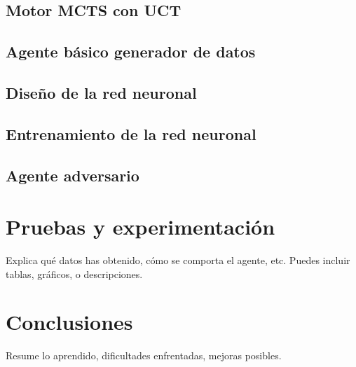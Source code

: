 \documentclass[conference]{IEEEtran}
\begin{document}
\subsection{Motor MCTS con UCT}


\subsection{Agente básico generador de datos}


\subsection{Diseño de la red neuronal}


\subsection{Entrenamiento de la red neuronal}


\subsection{Agente adversario}



\section{Pruebas y experimentación}
Explica qué datos has obtenido, cómo se comporta el agente, etc. Puedes incluir tablas, gráficos, o descripciones.

\section{Conclusiones}
Resume lo aprendido, dificultades enfrentadas, mejoras posibles.




\end{document}
